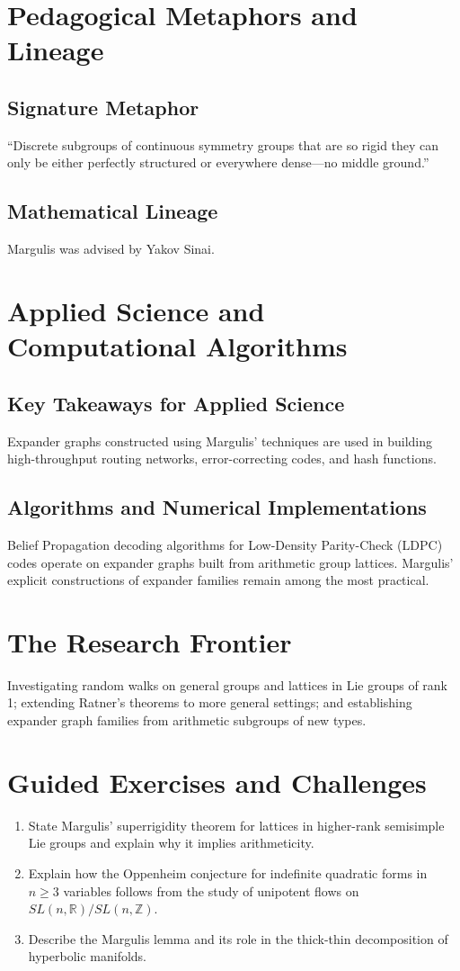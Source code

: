 \section{Pedagogical Metaphors and Lineage}
\subsection{Signature Metaphor}
``Discrete subgroups of continuous symmetry groups that are so rigid they can only be either perfectly structured or everywhere dense---no middle ground.''

\subsection{Mathematical Lineage}
Margulis was advised by Yakov Sinai.

\section{Applied Science and Computational Algorithms}
\subsection{Key Takeaways for Applied Science}
Expander graphs constructed using Margulis' techniques are used in building high-throughput routing networks, error-correcting codes, and hash functions.

\subsection{Algorithms and Numerical Implementations}
Belief Propagation decoding algorithms for Low-Density Parity-Check (LDPC) codes operate on expander graphs built from arithmetic group lattices. Margulis' explicit constructions of expander families remain among the most practical.

\section{The Research Frontier}
Investigating random walks on general groups and lattices in Lie groups of rank 1; extending Ratner's theorems to more general settings; and establishing expander graph families from arithmetic subgroups of new types.

\section{Guided Exercises and Challenges}
\begin{enumerate}[label=\textbf{\arabic*.}]
  \item State Margulis' superrigidity theorem for lattices in higher-rank semisimple Lie groups and explain why it implies arithmeticity.
  \item Explain how the Oppenheim conjecture for indefinite quadratic forms in $n \geq 3$ variables follows from the study of unipotent flows on $SL(n,\mathbb{R})/SL(n,\mathbb{Z})$.
  \item Describe the Margulis lemma and its role in the thick-thin decomposition of hyperbolic manifolds.
\end{enumerate}

